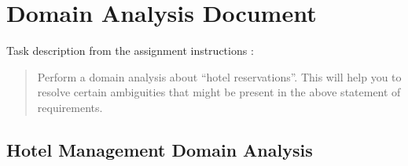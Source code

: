 %
%
%


\section{Domain Analysis Document}
Task description from the assignment instructions
\cite{2dv603:assignment1-instructions}:

\begin{quote}
  Perform a domain analysis about ``hotel reservations''. This will help you to
  resolve certain ambiguities that might be present in the above statement of
  requirements.
\end{quote}


\subsection{Hotel Management Domain Analysis}
%
%

